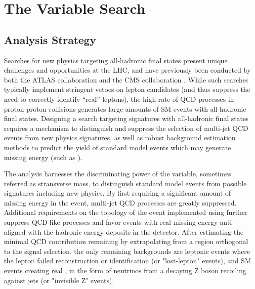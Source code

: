 \chapter{The \texorpdfstring{\mttwo} VVariable Search}
\label{ch:analysis}

\section{Analysis Strategy}
\label{sec:strategy}
Searches for new physics targeting all-hadronic final states present unique challenges and opportunities at the LHC, and have previously been conducted by both the ATLAS collaboration \cite{Aad:2016jxj,Aaboud:2016tnv,Aaboud:2016zdn,Aad:2016eki,Aaboud:2016nwl,Khachatryan:2016epu} and the CMS collaboration \cite{Khachatryan:2016xvy,Khachatryan:2016kdk,Khachatryan:2016dvc}. While such searches typically implement stringent vetoes on lepton candidates (and thus suppress the need to correctly identify ``real'' leptons), the high rate of QCD processes in proton-proton collisions generates large amounts of SM events with all-hadronic final states. Designing a search targeting signatures with all-hadronic final states requires a mechanism to distinguish and suppress the selection of multi-jet QCD events from new physics signatures, as well as robust background estimation methods to predict the yield of standard model events which may generate missing energy (such as \znunu).

The \mttwo analysis harnesses the discriminating power of the \mttwo variable, sometimes referred as stransverse mass, to distinguish standard model events from possible signatures including new physics. By first requiring a significant amount of missing energy in the event, multi-jet QCD processes are greatly suppressed. Additional requirements on the topology of the event implemented using \mttwo further suppress QCD-like processes and favor events with real missing energy anti-aligned with the hadronic energy deposits in the detector. After estimating the minimal QCD contribution remaining by extrapolating from a region orthogonal to the signal selection, the only remaining backgrounds are leptonic events where the lepton failed reconstruction or identification (or "lost-lepton" events), and SM events creating real \MET, in the form of neutrinos from a decaying Z boson recoiling against jets (or "invisible Z" events).

